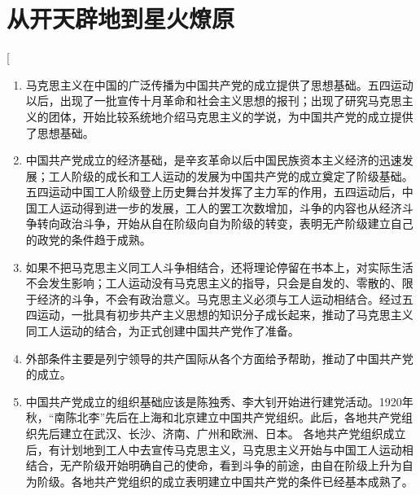 \section{从开天辟地到星火燎原}
\begin{enumerate}
	\question[为什么说新文化运动是近代中国一次伟大的思想启蒙运动？]
	\question[为什么说中国共产党的成立是历史的必然？]
	\ans[
		\begin{enumerate}
			\item 马克思主义在中国的广泛传播为中国共产党的成立提供了思想基础。五四运动以后，出现了一批宣传十月革命和社会主义思想的报刊；出现了研究马克思主义的团体，开始比较系统地介绍马克思主义的学说，为中国共产党的成立提供了思想基础。
			\item 中国共产党成立的经济基础，是辛亥革命以后中国民族资本主义经济的迅速发展；工人阶级的成长和工人运动的发展为中国共产党的成立奠定了阶级基础。五四运动中国工人阶级登上历史舞台并发挥了主力军的作用，五四运动后，中国工人运动得到进一步的发展，工人的罢工次数增加，斗争的内容也从经济斗争转向政治斗争，开始从自在阶级向自为阶级的转变，表明无产阶级建立自己的政党的条件趋于成熟。
			\item 如果不把马克思主义同工人斗争相结合，还将理论停留在书本上，对实际生活不会发生影响；工人运动没有马克思主义的指导，只会是自发的、零散的、限于经济的斗争，不会有政治意义。马克思主义必须与工人运动相结合。经过五四运动，一批具有初步共产主义思想的知识分子成长起来，推动了马克思主义同工人运动的结合，为正式创建中国共产党作了准备。
			\item 外部条件主要是列宁领导的共产国际从各个方面给予帮助，推动了中国共产党的成立。
			\item 中国共产党成立的组织基础应该是陈独秀、李大钊开始进行建党活动。1920年秋，“南陈北李”先后在上海和北京建立中国共产党组织。此后，各地共产党组织先后建立在武汉、长沙、济南、广州和欧洲、日本。 各地共产党组织成立后，有计划地到工人中去宣传马克思主义，马克思主义开始与中国工人运动相结合，无产阶级开始明确自己的使命，看到斗争的前途，由自在阶级上升为自为阶级。各地共产党组织的成立表明建立中国共产党的条件已经基本成熟了。
		\end{enumerate}


\end{enumerate}
